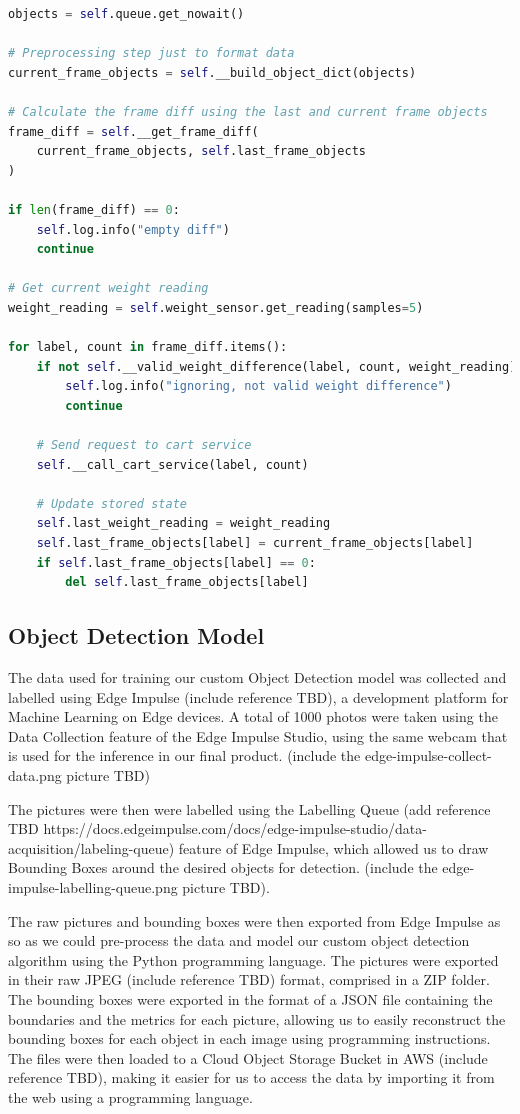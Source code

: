 \documentclass[openright]{normas-utf-tex} %
\begin{document}
\begin{lstlisting}[language=Python,caption={Product Recognizer thread logic}]
objects = self.queue.get_nowait()

# Preprocessing step just to format data
current_frame_objects = self.__build_object_dict(objects)

# Calculate the frame diff using the last and current frame objects
frame_diff = self.__get_frame_diff(
    current_frame_objects, self.last_frame_objects
)

if len(frame_diff) == 0:
    self.log.info("empty diff")
    continue

# Get current weight reading
weight_reading = self.weight_sensor.get_reading(samples=5)

for label, count in frame_diff.items():
    if not self.__valid_weight_difference(label, count, weight_reading):
        self.log.info("ignoring, not valid weight difference")
        continue

    # Send request to cart service
    self.__call_cart_service(label, count)

    # Update stored state
    self.last_weight_reading = weight_reading
    self.last_frame_objects[label] = current_frame_objects[label]
    if self.last_frame_objects[label] == 0:
        del self.last_frame_objects[label]
\end{lstlisting}

\subsection{Object Detection Model}

The data used for training our custom Object Detection model was collected and labelled
using Edge Impulse (include reference TBD), a development platform for Machine Learning 
on Edge devices.
A total of 1000 photos were taken using the Data Collection feature of the Edge Impulse Studio,
using the same webcam that is used for the inference in our final product.
(include the edge-impulse-collect-data.png picture TBD)

The pictures were then were labelled using the Labelling Queue 
(add reference TBD https://docs.edgeimpulse.com/docs/edge-impulse-studio/data-acquisition/labeling-queue) 
feature of Edge Impulse, which allowed us to draw Bounding Boxes around the desired objects for detection.
(include the edge-impulse-labelling-queue.png picture TBD).

The raw pictures and bounding boxes were then exported from Edge Impulse as so as
we could pre-process the data and model our custom object detection algorithm using the 
Python programming language.
The pictures were exported in their raw JPEG (include reference TBD) format, comprised in a ZIP folder.
The bounding boxes were exported in the format of a JSON file containing the boundaries and the metrics
for each picture, allowing us to easily reconstruct the bounding boxes for each object in each image
using programming instructions. The files were then loaded to a Cloud Object Storage Bucket in AWS
(include reference TBD), making it easier for us to access the data by importing it from the web using 
a programming language.
\end{document}
